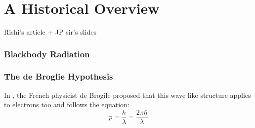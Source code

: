 \chapter{A Historical Overview}
Rishi's article + JP sir's slides
\subsection{Blackbody Radiation}
\subsection{The de Broglie Hypothesis}
In , the French physicist de Brogile proposed that this wave like structure applies to electrons too and follows the equation:
\begin{equation}
p = \frac{h}{\lambda} = \frac{2 \pi \hbar}{ \lambda}
\end{equation}